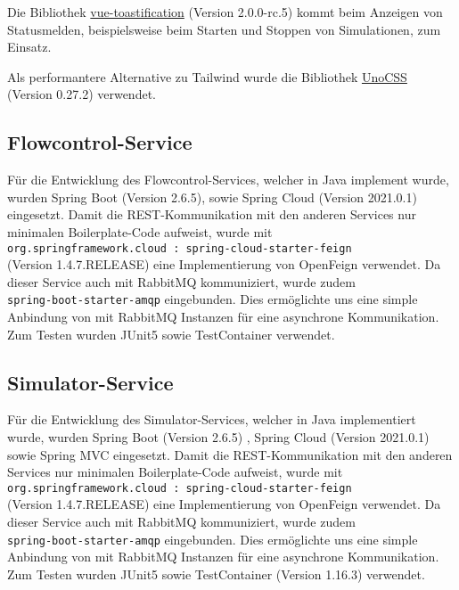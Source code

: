Die Bibliothek \href{https://github.com/Maronato/vue-toastification}{vue-toastification} (Version 2.0.0-rc.5) kommt beim Anzeigen von Statusmelden, beispielsweise beim Starten und Stoppen von Simulationen, zum Einsatz.

Als performantere Alternative zu Tailwind wurde die Bibliothek \href{https://uno.antfu.me}{UnoCSS} (Version 0.27.2) verwendet.

\subsection{Flowcontrol-Service}

Für die Entwicklung des Flowcontrol-Services, welcher in Java implement wurde, wurden Spring Boot (Version 2.6.5), sowie Spring Cloud (Version 2021.0.1) eingesetzt.
Damit die REST-Kommunikation mit den anderen Services nur minimalen Boilerplate-Code aufweist, wurde mit \\ \verb|org.springframework.cloud : spring-cloud-starter-feign| \\ (Version 1.4.7.RELEASE) eine Implementierung von OpenFeign verwendet.
Da dieser Service auch mit RabbitMQ kommuniziert, wurde zudem \\ \verb|spring-boot-starter-amqp| eingebunden.
Dies ermöglichte uns eine simple Anbindung von mit RabbitMQ Instanzen für eine asynchrone Kommunikation.
Zum Testen wurden JUnit5 sowie TestContainer verwendet.

\subsection{Simulator-Service}

Für die Entwicklung des Simulator-Services, welcher in Java implementiert wurde, wurden Spring Boot (Version 2.6.5) , Spring Cloud (Version 2021.0.1) sowie Spring MVC eingesetzt.
Damit die REST-Kommunikation mit den anderen Services nur minimalen Boilerplate-Code aufweist, wurde mit \\ \verb|org.springframework.cloud : spring-cloud-starter-feign| \\ (Version 1.4.7.RELEASE) eine Implementierung von OpenFeign verwendet.
Da dieser Service auch mit RabbitMQ kommuniziert, wurde zudem \\ \verb|spring-boot-starter-amqp| eingebunden.
Dies ermöglichte uns eine simple Anbindung von mit RabbitMQ Instanzen für eine asynchrone Kommunikation.
Zum Testen wurden JUnit5 sowie TestContainer (Version 1.16.3) verwendet.

